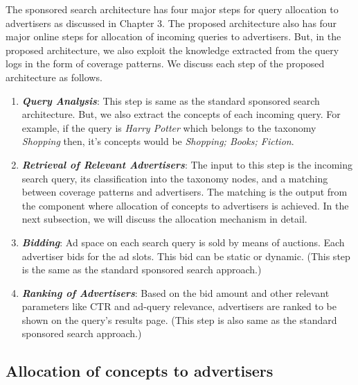 The sponsored search architecture has four major steps for query allocation to advertisers as discussed in Chapter 3. The proposed architecture also has four major online steps for allocation of incoming queries to advertisers. But, in the proposed architecture, we also exploit the knowledge extracted from the query logs in the form of coverage patterns. We discuss each step of the proposed architecture as follows.
\begin{enumerate}[label=(\roman*).]
    \item \textbf{{\em Query Analysis}}: This step is same as the standard sponsored search architecture. But, we also extract the concepts of each incoming query. For example, if the query is \textit{Harry Potter} which belongs to the taxonomy \textit{Shopping} then, it's concepts would be \textit{Shopping; Books; Fiction}.
    \item \textbf{{\em Retrieval of Relevant Advertisers}}: The input to this step is the incoming search query, its classification into the taxonomy nodes, and a matching between coverage patterns and advertisers. The matching is the output from the component where allocation of concepts to advertisers is achieved. In the next subsection, we will discuss the allocation mechanism in detail.

    \item \textbf{{\em Bidding}}: Ad space on each search query is sold by means of auctions. Each advertiser bids for the ad slots. This bid can be static or dynamic. (This step is the same as the standard sponsored search approach.) 
    
    
    \item \textbf{{\em Ranking of  Advertisers}}: Based on the bid amount and other relevant parameters like CTR and ad-query relevance, advertisers are ranked to be shown on the query's results page. (This step is also same as the standard sponsored search approach.)
\end{enumerate}



\subsection{Allocation of concepts to advertisers}

